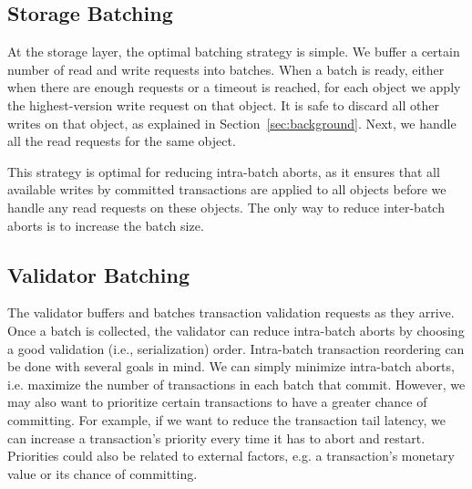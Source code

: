 \subsection{Storage Batching}
At the storage layer, the optimal batching strategy is simple. We buffer a certain number of read and write requests into batches. 
When a batch is ready, either when there are enough requests or a timeout is reached, for each object we apply the highest-version write request on that object. It is safe to discard all other writes on that object, as explained in Section~\ref{sec:background}. Next, we handle all the read requests for the same object. 

This strategy is optimal for reducing intra-batch aborts, as it ensures that all available writes by committed transactions are applied to all objects before we handle any read requests on these objects. The only way to reduce inter-batch aborts is to increase the batch size.

\subsection{Validator Batching}\label{subsec:overview:validator}

The validator buffers and batches transaction validation requests as they arrive.
Once a batch is collected, the validator can reduce intra-batch aborts by choosing a good validation (i.e., serialization) order.
Intra-batch transaction reordering can be done with several goals in mind. We can simply minimize intra-batch aborts, i.e. maximize the number of transactions in each batch that commit. However, we may also want to prioritize certain transactions to have a greater chance of committing. For example, if we want to reduce the transaction tail latency, we can increase a transaction's priority every time it has to abort and restart. Priorities could also be related to external factors, e.g. a transaction's monetary value or its chance of committing.

